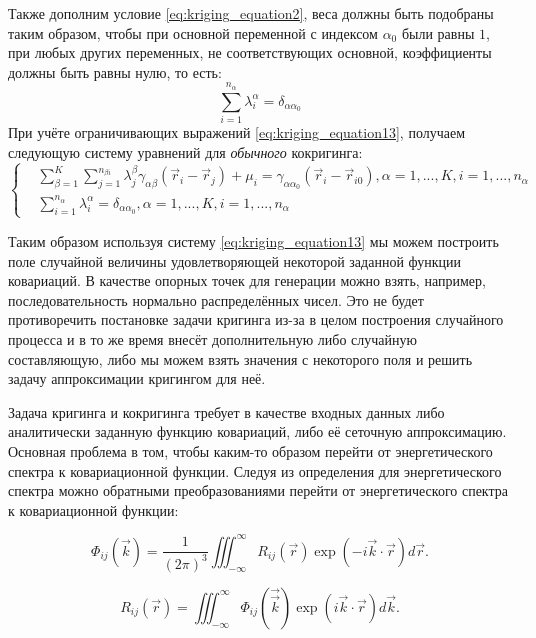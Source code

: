 Также дополним условие \eqref{eq:kriging_equation2}, веса должны быть подобраны таким образом, чтобы при основной переменной с индексом $\alpha_0$ были равны $1$, при любых других переменных, не соответствующих основной, коэффициенты должны быть равны нулю, то есть:
\begin{equation}
    \label{eq:kriging_equation13}
    \sum_{i = 1}^{n_\alpha} \lambda_i^{\alpha} = \delta_{\alpha \alpha_0}
\end{equation}
При учёте ограничивающих выражений \eqref{eq:kriging_equation13}, получаем следующую систему уравнений для \textit{обычного} кокригинга:
\[ 
\left\{
  \begin{array}{rl}
  \label{eq:kriging_equation13}
	&\sum_{\beta=1}^K \sum_{j = 1}^{n_{\beta i}} \lambda_j^{\beta} \gamma_{\alpha \beta}(\vec r_i - \vec r_j) + \mu_i = \gamma_{\alpha \alpha_0}(\vec r_i - \vec r_{i0}), \alpha = 1, ..., K, i = 1,...,n_\alpha \\
	&\sum_{i = 1}^{n_\alpha} \lambda_i^{\alpha} = \delta_{\alpha \alpha_0}, \alpha = 1, ..., K, i = 1,...,n_\alpha
  \end{array}
\right.
\]

Таким образом используя систему \ref{eq:kriging_equation13} мы можем построить поле случайной величины удовлетворяющей некоторой заданной функции ковариаций. В качестве опорных точек для генерации можно взять, например, последовательность нормально распределённых чисел. Это не будет противоречить постановке задачи кригинга из-за в целом построения случайного процесса и в то же время внесёт дополнительную либо случайную составляющую, либо мы можем взять значения с некоторого поля и решить задачу аппроксимации кригингом для неё. 

Задача кригинга и кокригинга требует в качестве входных данных либо аналитически заданную функцию ковариаций, либо её сеточную аппроксимацию. Основная проблема в том, чтобы каким-то образом перейти от энергетического спектра к ковариационной функции. Следуя из определения для энергетического спектра \cite{pope2000turbulent} можно обратными преобразованиями перейти от энергетического спектра к ковариационной функции:

\begin{equation}
    \label{eq:kriging_equation14}
    \Phi_{ij}(\vec{k}) = \frac{1}{(2 \pi)^3} \iiint_{-\infty}^{\infty} R_{ij}(\vec{r}) \exp{(- i \vec{k} \cdot \vec{r})} d\vec{r}.
\end{equation}

\begin{equation}
    \label{eq:kriging_equation14_2}
    R_{ij}(\vec{r}) = \iiint_{-\infty}^{\infty}  \Phi_{ij}(\vec{\vec k}) \exp{(i \vec k \cdot \vec r)} d \vec k.
\end{equation}

